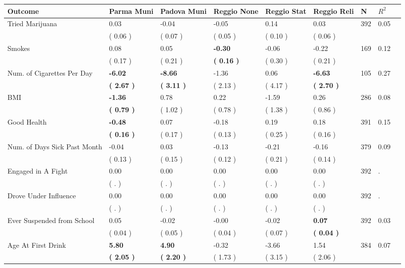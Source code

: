 \begin{tabular}{L{6.2cm} C{1.8cm} C{1.8cm} C{1.8cm} C{1.8cm} C{1.8cm} C{1.8cm} C{0.3cm} C{0.3cm}}
\toprule
 \textbf{Outcome} & \textbf{Parma Muni} & \textbf{Padova Muni} & \textbf{Reggio None} & \textbf{Reggio Stat} & \textbf{Reggio Reli} & \textbf{N} & \textbf{$ R^2$} \\
\midrule
Tried Marijuana &      0.03 &     -0.04 &     -0.05 &      0.14 &      0.03  & 392 &       0.05 \\ 
 & (     0.06 ) & (     0.07 ) & (     0.05 ) & (     0.10 ) & (     0.06 )  & \\
Smokes &      0.08 &      0.05 & \textbf{    -0.30} &     -0.06 &     -0.22  & 169 &       0.12 \\ 
 & (     0.17 ) & (     0.21 ) & \textbf{(     0.16 )} & (     0.30 ) & (     0.21 )  & \\
Num. of Cigarettes Per Day & \textbf{    -6.02} & \textbf{    -8.66} &     -1.36 &      0.06 & \textbf{    -6.63}  & 105 &       0.27 \\ 
 & \textbf{(     2.67 )} & \textbf{(     3.11 )} & (     2.13 ) & (     4.17 ) & \textbf{(     2.70 )}  & \\
BMI & \textbf{    -1.36} &      0.78 &      0.22 &     -1.59 &      0.26  & 286 &       0.08 \\ 
 & \textbf{(     0.79 )} & (     1.02 ) & (     0.78 ) & (     1.38 ) & (     0.86 )  & \\
Good Health & \textbf{    -0.48} &      0.07 &     -0.18 &      0.19 &      0.18  & 391 &       0.15 \\ 
 & \textbf{(     0.16 )} & (     0.17 ) & (     0.13 ) & (     0.25 ) & (     0.16 )  & \\
Num. of Days Sick Past Month &     -0.04 &      0.03 &     -0.13 &     -0.21 &     -0.16  & 379 &       0.09 \\ 
 & (     0.13 ) & (     0.15 ) & (     0.12 ) & (     0.21 ) & (     0.14 )  & \\
Engaged in A Fight &      0.00 &      0.00 &      0.00 &      0.00 &      0.00  & 392 &          . \\ 
 & (        . ) & (        . ) & (        . ) & (        . ) & (        . )  & \\
Drove Under Influence &      0.00 &      0.00 &      0.00 &      0.00 &      0.00  & 392 &          . \\ 
 & (        . ) & (        . ) & (        . ) & (        . ) & (        . )  & \\
Ever Suspended from School &      0.05 &     -0.02 &     -0.00 &     -0.02 & \textbf{     0.07}  & 392 &       0.03 \\ 
 & (     0.04 ) & (     0.05 ) & (     0.04 ) & (     0.07 ) & \textbf{(     0.04 )}  & \\
Age At First Drink & \textbf{     5.80} & \textbf{     4.90} &     -0.32 &     -3.66 &      1.54  & 384 &       0.07 \\ 
 & \textbf{(     2.05 )} & \textbf{(     2.20 )} & (     1.73 ) & (     3.15 ) & (     2.06 )  & \\
\bottomrule
\end{tabular}
